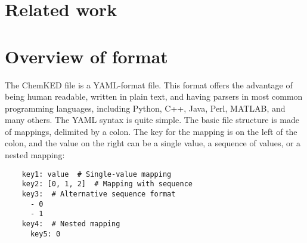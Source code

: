 \documentclass[12pt]{ussci}
\newcommand\ck{ChemKED}
\begin{document}
\section{Related work}
%


\section{Overview of format}\label{sec:overview-of-format}

The \ck{} file is a YAML-format file. This format offers the advantage of being
human readable, written in plain text, and having parsers in most common
programming languages, including Python, C++, Java, Perl, MATLAB, and many
others. The YAML syntax is quite simple. The basic file structure is made of
mappings, delimited by a colon. The key for the mapping is on the left of the
colon, and the value on the right can be a single value, a sequence of values, or a nested mapping:

\begin{verbatim}
    key1: value  # Single-value mapping
    key2: [0, 1, 2]  # Mapping with sequence
    key3:  # Alternative sequence format
      - 0
      - 1
    key4:  # Nested mapping
      key5: 0
\end{verbatim}
\end{document}
